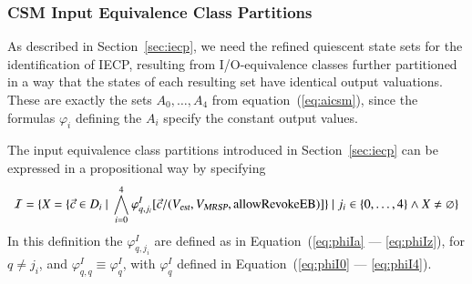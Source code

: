 \subsubsection{CSM Input Equivalence Class Partitions}\label{sec:csmiecpxxx}

As described in Section~\ref{sec:iecp}, we need the refined quiescent state sets
for the identification of IECP,  resulting from I/O-equivalence classes further partitioned in a way that the states of each resulting set have identical output valuations. These are exactly the sets $A_0,\dots,A_4$ from equation~(\ref{eq:aicsm}), since the
formulas $\varphi_i$ defining the $A_i$ specify the constant output values.

The input equivalence class partitions introduced in  Section~\ref{sec:iecp} can be expressed in a propositional way by specifying
\begin{equation}
{\cal I} = \{ X=\{\vec c\in D_i~|~\bigwedge_{i=0}^4 \varphi_{q,j_i}^I[\vec c/({V_{\text{\sl est}}},{V_{\text{\sl MRSP}}},\text{allowRevokeEB})]\}~|~j_i\in \{0,\dots,4\}
\wedge X\neq \varnothing   \}
\end{equation}
In this definition the   $\varphi_{q,j_i}^I$ are defined as in Equation~(\ref{eq:phiIa} --- \ref{eq:phiIz}), for $q \neq j_i$, and $\varphi_{q,q}^I \equiv \varphi_q^I$, with $\varphi_q^I$ defined in 
Equation~(\ref{eq:phiI0} --- \ref{eq:phiI4}). 
  
  
  
